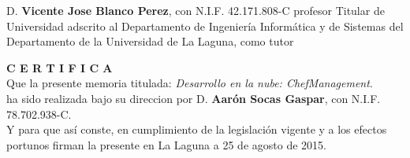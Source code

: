 \documentclass[a4paper,14pt]{report}
\begin{document}
	
	D. \textbf{Vicente Jose Blanco Perez}, con N.I.F. 42.171.808-C profesor Titular	de Universidad adscrito al Departamento de Ingeniería Informática y de Sistemas	del Departamento de la Universidad de La Laguna, como tutor \\
	\vspace*{0.6in}

	\textbf{C E R T I F I C A} \\

	\vspace*{0.1in}
	Que la presente memoria titulada: \emph{Desarrollo en la nube: ChefManagement}. \\

	\vspace*{0.1in}
	ha sido realizada bajo su direccion por D. \textbf{Aarón Socas Gaspar},	con N.I.F. 78.702.938-C. \\

	\vspace*{0.1in}
	Y para que así conste, en cumplimiento de la legislación vigente y a los efectos portunos firman la presente en La Laguna a 25 de agosto de 2015. 
\end{document}
